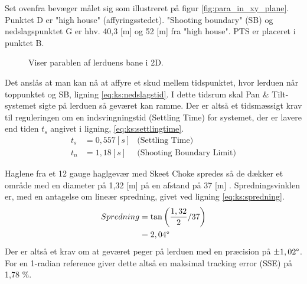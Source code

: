Set ovenfra bevæger målet sig som illustreret på figur \ref{fig:para_in_xy_plane}.
Punktet D er "high house" (affyringsstedet).
"Shooting boundary" (SB) og nedslagspunktet G er hhv. 40,3 [m] og 52 [m] fra "high house". PTS er placeret i punktet B.\\
\begin{figure}[h!]
\centering
{}
\caption[Lerduens parabel i 2D]{Viser parablen af lerduens bane i 2D.}
\end{figure}
Det anslås at man kan nå at affyre et skud mellem tidspunktet,
hvor lerduen når toppunktet og SB, ligning \ref{eq:ks:nedslagstid}.
I dette tidsrum skal Pan \& Tilt-systemet sigte på lerduen så geværet kan ramme.
Der er altså et tidsmæssigt krav til reguleringen om en indsvingningstid (Settling Time) for systemet,
der er lavere end tiden \(t_{s}\) angivet i ligning, \ref{eq:ks:settlingtime}.
\begin{align}
  t_{s} &= 0,557 [s] &\text{(Settling Time)}
  \label{eq:ks:settlingtime}
\\
  t_{n} &= 1,18 [s] &\text{(Shooting Boundary Limit)}
  \label{eq:ks:nedslagstid}
\end{align}

Haglene fra et 12 gauge haglgevær med Skeet Choke spredes så de dækker et område
med en diameter på 1,32 [m] på en afstand på 37 [m] \citep[Pattern and choke]{patternandchoke}.
Spredningsvinklen er, med en antagelse om lineær spredning, givet ved ligning \ref{eq:ks:spredning}.
\begin{align}
  Spredning &= \tan \left(\frac{1,32}{2} / 37 \right) \\
  &= 2,04 \degree
  \label{eq:ks:spredning}
\end{align}
Der er altså et krav om at geværet peger på lerduen med en præcision på \(\pm 1,02 \degree\).
For en 1-radian reference giver dette altså en maksimal tracking error (SSE) på 1,78 \%.

